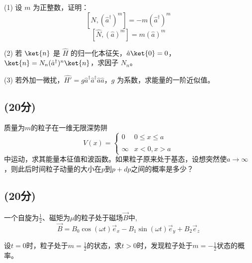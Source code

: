 (1) 设 $m$ 为正整数，证明：
$$[\hat{N}, (\hat{a}^\dagger)^m] = -m(\hat{a}^\dagger)^m~$$ 
$$[\hat{N}, (\hat{a})^m] = m(\hat{a})^m~$$

(2) 若 $\ket{n}$ 是 $\hat{H}$ 的归一化本征矢，$\hat{a}\ket{0} = 0$，$\ket{n} = N_n ( \hat{a}^\dagger )^n\ket{n}$，求因子 $N_n$。

(3) 若外加一微扰，$\hat{H'} = g\hat{a}^\dagger \hat{a}^\dagger \hat{a} \hat{a}$，$g$ 为系数，求能量的一阶近似值。
\subsection{(20分)}
 质量为$m$的粒子在一维无限深势阱
\[V(x) = \begin{cases} 0 & 0 \leq x \leq a \\\\\infty & x < 0, x > a \end{cases}~\]
中运动，求其能量本征值和波函数。如果粒子原来处于基态，设想突然使$a \to \infty$，则此后时间粒子动量的大小在$p$到$p + d p$之间的概率是多少？
\subsection{(20分)}
 一个自旋为$\frac{1}{2}$、磁矩为$\mu$的粒子处于磁场$\vec{B}$中,
\[
\vec{B} = B_0 \cos(\omega t) \vec{e}_x - B_1 \sin(\omega t) \vec{e}_y + B_2 \vec{e}_z~
\]

设$t = 0$时，粒子处于$m = \frac{1}{2}$的状态，求$t > 0$时，发现粒子处于$m= -\frac{1}{2}$状态的概率。
